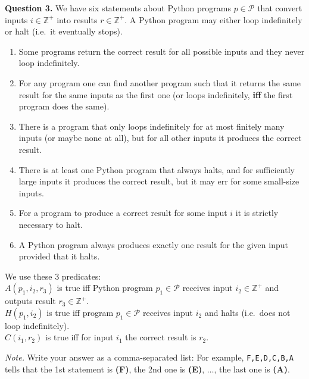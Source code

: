 \documentclass[jou]{apa6}
\begin{document}
\vspace{6pt}
{\bf Question 3.} We have six statements about Python programs $p \in \mathcal{P}$
that convert inputs $i \in \mathbb{Z}^{+}$ into results $r \in \mathbb{Z}^{+}$.  
A Python program may either loop indefinitely or halt (i.e.\ it eventually stops).

\begin{enumerate}
\item Some programs return the correct result for all possible inputs and 
they never loop indefinitely.
\item For any program one can find another program such that it returns
the same result for the same inputs as the first one (or loops indefinitely, 
{\color{red} \bf iff} the first program does the same).
\item There is a program that only loops indefinitely for at most finitely many inputs (or maybe none at all), 
but for all other inputs it produces the correct result.
\item There is at least one Python program that always halts, and for sufficiently large inputs it produces
the correct result, but it may err for some small-size inputs.
\item For a program to produce a correct result for some input $i$ it is strictly necessary to halt.\\
\item A Python program always produces exactly one result for the given input provided that it halts.
\end{enumerate}

We use these $3$ predicates:\\
$A(p_1,i_2,r_3)$ is true iff
Python program $p_1 \in \mathcal{P}$ receives input $i_2 \in \mathbb{Z}^{+}$ and outputs 
result $r_3 \in \mathbb{Z}^{+}$.\\
$H(p_1,i_2)$ is true iff program $p_1 \in \mathcal{P}$ receives input $i_2$ and halts (i.e.\ does not
loop indefinitely).\\
$C(i_1,r_2)$ is true iff for input $i_1$ the correct result is $r_2$. 

{\em Note.} Write your answer as a comma-separated list: For example, 
{\tt F,E,D,C,B,A} tells that the 1st statement is {\bf (F)}, the 2nd one
is {\bf (E)}, $\ldots$, the last one is {\bf (A)}.
\end{document}
